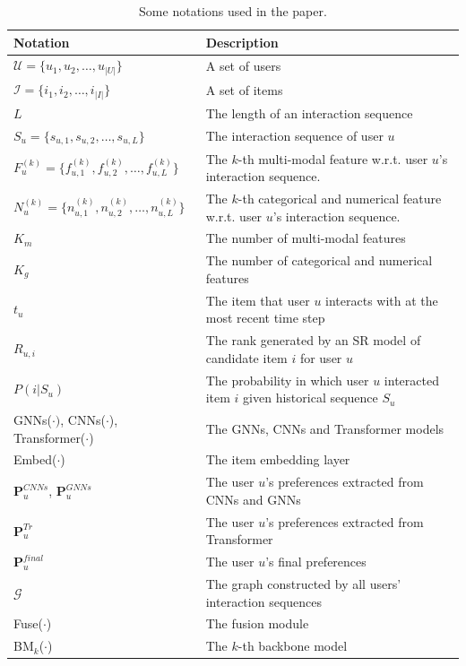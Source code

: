 \documentclass[review]{fcs}
\begin{document}
	\begin{table}[!ht]
		\caption{Some notations used in the paper.}
		\label{tab:notations}
		\centering
		\begin{tabular}{ll}
			\hline
			Notation & Description\\
			\hline
			$\mathcal{U} = \{u_{1}, u_{2}, \ldots, u_{|U|}\}$ & A set of users\\
			$\mathcal{I} = \{i_{1}, i_{2}, \ldots, i_{|I|}\}$ & A set of items\\
			$L$ & The length of an interaction sequence\\
			$S_{u} = \{s_{u,1}, s_{u,2}, \ldots, s_{u,L}\}$ & The interaction sequence of user $u$\\
			$F_{u}^{(k)} = \{f_{u,1}^{(k)}, f_{u,2}^{(k)}, \ldots, f_{u,L}^{(k)}\}$ & The $k$-th multi-modal feature w.r.t. user $u$'s interaction sequence.\\
			$N_{u}^{(k)} = \{n_{u,1}^{(k)}, n_{u,2}^{(k)}, \ldots, n_{u,L}^{(k)}\}$ & The $k$-th categorical and numerical feature w.r.t. user $u$'s interaction sequence.\\
			$K_{m}$ & The number of multi-modal features\\
			$K_{g}$ & The number of categorical and numerical features\\
			$t_{u}$ & The item that user $u$ interacts with at the most recent time step\\
			$R_{u,i}$ & The rank generated by an SR model of candidate item $i$ for user $u$\\
			$P(i|S_{u})$ & The probability in which user $u$ interacted item $i$ given historical sequence $S_{u}$\\
			\hline
			GNNs($\cdot)$, CNNs($\cdot$), Transformer($\cdot$) & The GNNs, CNNs and Transformer models\\
			Embed($\cdot$) & The item embedding layer\\
			 $\mathbf{P}_{u}^{CNNs}$, $\mathbf{P}_{u}^{GNNs}$ & The user $u$'s preferences extracted from CNNs and GNNs\\
			$\mathbf{P}_{u}^{Tr}$ & The user $u$'s preferences extracted from Transformer\\
			$\mathbf{P}_{u}^{final}$ & The user $u$'s final preferences\\
			$\mathcal{G}$ & The graph constructed by all users' interaction sequences\\
			Fuse($\cdot$) & The fusion module\\
			\hline
			BM$_{k}$($\cdot$) & The $k$-th backbone model\\

\end{tabular}
\end{table}
\end{document}
